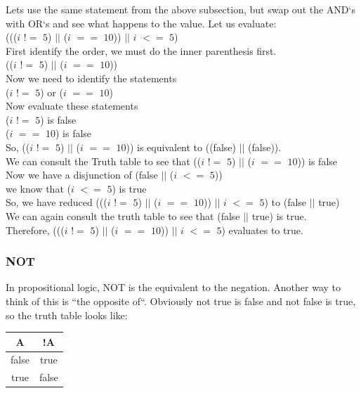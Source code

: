 \documentclass[11]{article}
\begin{document}
Lets use the same statement from the above subsection, but swap out the AND`s with OR`s and see what happens to the value. Let us evaluate: \\
((($i$ $!=$ $5$) $||$ ($i$ $==$ $10$)) $||$ $i$ $<=$ $5$)\\

First identify the order, we must do the inner parenthesis first.\\
(($i$ $!=$ $5$) $||$ ($i$ $==$ $10$))\\
Now we need to identify the statements\\
($i$ $!=$ $5$) or ($i$ $==$ $10$) \\
Now evaluate these statements \\
($i$ $!=$ $5$) is false\\
 ($i$ $==$ $10$) is false \\
 So, (($i$ $!=$ $5$) $||$ ($i$ $==$ $10$)) is equivalent to ((false) $||$ (false)).\\
 We can consult the Truth table to see that (($i$ $!=$ $5$) $||$ ($i$ $==$ $10$)) is false\\
 
 Now we have a disjunction of (false $||$ ($i$ $<=$ $5$))\\
 we know that ($i$ $<=$ $5$) is true \\
 So, we have reduced ((($i$ $!=$ $5$) $||$ ($i$ $==$ $10$)) $||$ $i$ $<=$ $5$) to (false $||$ true)\\
 We can again consult the truth table to see that (false $||$ true) is true.\\
 
 Therefore, ((($i$ $!=$ $5$) $||$ ($i$ $==$ $10$)) $||$ $i$ $<=$ $5$) evaluates to true.
 
 \subsubsection{NOT}
 In propositional logic, NOT is the equivalent to the negation. Another way to think of this is ``the opposite of``. Obviously not true is false and not false is true, so the truth table looks like:\\
 
  \begin{center}
  \begin{tabular}{ | c | c |}
    \hline
    A & !A  \\ \hline
    false & true\\ \hline
    true & false\\ 
    \hline
  \end{tabular}
\end{center}
\end{document}
